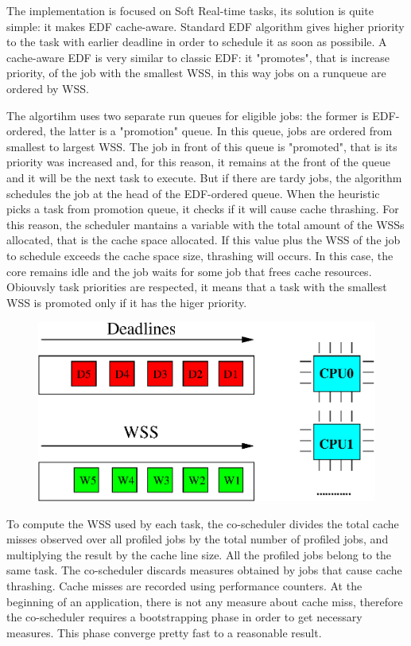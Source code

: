\begin{description}
The implementation is focused on Soft Real-time tasks, its solution is quite simple: it makes EDF cache-aware. Standard EDF algorithm gives higher priority 
to the task with earlier deadline in order to schedule it as soon as possibile. A cache-aware EDF is very similar to classic EDF: it "promotes", that is 
increase priority, of the job with the smallest WSS, in this way jobs on a runqueue are ordered by WSS.

The algortihm uses two separate run queues for eligible jobs: the former is EDF-ordered, the latter is a "promotion" queue. In this queue, jobs are ordered
from smallest to largest WSS. The job in front of this queue is "promoted", that is its priority was increased and, for this reason, it remains at the front
of the queue and it will be the next task to execute. But if there are tardy jobs, the algorithm schedules the job at the head of the EDF-ordered queue.
When the heuristic picks a task from promotion queue, it checks if it will cause cache thrashing. For this reason, the scheduler mantains a variable with 
the total amount of the WSSs allocated, that is the cache space allocated. If this value plus the WSS of the job to schedule exceeds the cache space size, 
thrashing will occurs. In this case, the core remains idle and the job waits for some job that frees cache resources.
Obiouvsly task priorities are respected, it means that a task with the smallest WSS is promoted only if it has the higer priority.

\begin{figure}[htbp]
\centering
\includegraphics[width=\widefigure]{images/edf_wss.eps}
\caption{}
\label{fig:edf_wss}
\end{figure}

To compute the WSS used by each task, the co-scheduler divides the total cache misses observed over all profiled jobs by the total number of profiled jobs, 
and multiplying the result by the cache line size. All the profiled jobs belong to the same task. The co-scheduler discards measures obtained by jobs that 
cause cache thrashing. Cache misses are recorded using performance counters. At the beginning of an application, there is not any measure about cache miss, 
therefore the co-scheduler requires a bootstrapping phase in order to get necessary measures. This phase converge pretty fast to a reasonable result.


\end{description}
